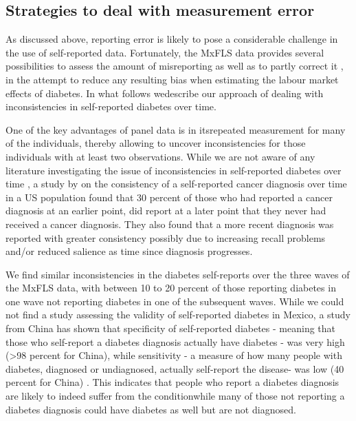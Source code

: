 
\providecommand{\tabularnewline}{\\}

\subsection{Strategies to deal with measurement error}

As discussed above, reporting error is likely to pose a considerable
challenge in the use of self-reported data. Fortunately, the \ac{MxFLS}
data provides several possibilities to assess the amount of misreporting
as well as to partly correct it , in the attempt to reduce any resulting
bias when estimating the labour market effects of diabetes. In what
follows wedescribe our approach of dealing with inconsistencies in
self-reported diabetes over time.

One of the key advantages of panel data is in itsrepeated measurement
for many of the individuals, thereby allowing to uncover inconsistencies
for those individuals with at least two observations. While we are
not aware of any literature investigating the issue of inconsistencies
in self-reported diabetes over time , a study by \citet{Zajacova2010}
on the consistency of a self-reported cancer diagnosis over time in
a US population found that 30 percent of those who had reported a
cancer diagnosis at an earlier point, did report at a later point
that they never had received a cancer diagnosis. They also found that
a more recent diagnosis was reported with greater consistency possibly
due to increasing recall problems and/or reduced salience as time
since diagnosis progresses.

We find similar inconsistencies in the diabetes self-reports over
the three waves of the \ac{MxFLS} data, with between 10 to 20 percent
of those reporting diabetes in one wave not reporting diabetes in
one of the subsequent waves. While we could not find a study assessing
the validity of self-reported diabetes in Mexico, a study from China
has shown that specificity of self-reported diabetes - meaning that
those who self-report a diabetes diagnosis actually have diabetes
- was very high (>98 percent for China), while sensitivity - a measure
of how many people with diabetes, diagnosed or undiagnosed, actually
self-report the disease- was low (40 percent for China) \citep{Yuan2015a}.
This indicates that people who report a diabetes diagnosis are likely
to indeed suffer from the conditionwhile many of those not reporting
a diabetes diagnosis could have diabetes as well but are not diagnosed.

